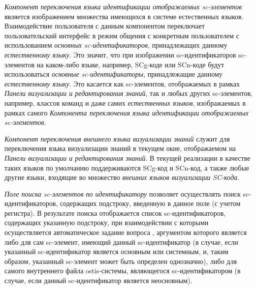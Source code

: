 \textit{Компонент переключения языка идентификации отображаемых sc-элементов} является изображением множества
имеющихся в системе естественных языков. Взаимодействие пользователя с данным компонентом переключает
пользовательский интерфейс в режим общения с конкретным пользователем с использованием \textit{основных sc-идентификаторов},
принадлежащих данному \textit{естественному языку}. Это значит, что при изображении sc-идентификаторов sc-элементов
на каком-либо языке, например, SCg-коде или SCn-коде будут использоваться \textit{основные sc-идентификаторы},
принадлежащие данному \textit{естественному языку}. Это касается как sc-элементов, отображаемых в рамках
\textit{Панели визуализации и редактирования знаний}, так и любых других sc-элементов, например, классов команд и
даже самих \textit{естественных языков}, изображаемых в рамках самого \textit{Компонента переключения языка идентификации
отображаемых sc-элементов}.

\textit{Компонент переключения внешнего языка визуализации знаний} служит для переключения языка визуализации знаний в
текущем окне, отображаемом на \textit{Панели визуализации и редактирования знаний}. В текущей реализации в качестве
таких языков по умолчанию поддерживаются SCg-код и SCn-код, а также любые другие языки, входящие во множество
\textit{внешних языков визуализации SC-кода}.

\textit{Поле поиска sc-элементов по идентификатору} позволяет осуществлять поиск \mbox{sc-идентификаторов}, содержащих
подстроку, введенную в данное поле (с учетом регистра). В результате поиска отображается список sc-идентификаторов,
содержащих указанную подстроку, при взаимодействии с которыми осуществляется автоматическое задание вопроса
, аргументом которого является либо для сам sc-элемент, имеющий данный sc-идентификатор (в случае,
если указанный sc-идентификатор является основным или системным, и, таким образом, указанный sc-элемент может быть
определен однозначно), либо для самого внутреннего файла ostis-системы, являющегося sc-идентификатором (в случае, если
данный sc-идентификатор является неосновным).

